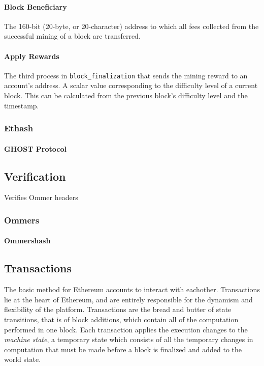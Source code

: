 \documentclass[10pt,a4paper,leqno,bibliography=totoc]{scrartcl}
\newenvironment{alphafootnotes}
{\par\edef\savedfootnotenumber{\number\value{footnote}}
\renewcommand{\thefootnote}{\alph{footnote}}
\setcounter{footnote}{0}}
{\par\setcounter{footnote}{\savedfootnotenumber}}
\begin{document}
\begin{alphafootnotes}
\begin{multicols*}{2}
			\paragraph{Block Beneficiary} The 160-bit (20-byte, or 20-character) address to which all fees collected from the successful mining of a block are transferred.
			\paragraph{Apply Rewards} The third process in \texttt{block\_finalization} that sends the mining reward to an account's address. A scalar value corresponding to the difficulty level of a current block. This can be calculated from the previous block's difficulty level and the timestamp. 

			\subsubsection{Ethash}
	
			\paragraph{GHOST Protocol}

		\subsection{Verification}
		    Verifies Ommer headers

			\subsubsection{Ommers}
				\paragraph{Ommershash}

		\subsection{Transactions}
			The basic method for Ethereum accounts to interact with eachother. Transactions lie at the heart of Ethereum, and are entirely responsible for the dynamism and flexibility of the platform. Transactions are the bread and butter of state transitions, that is of block additions, which contain all of the computation performed in one block. Each transaction applies the execution changes to the \textit{machine state}, a temporary state which consists of all the temporary changes in computation that must be made before a block is finalized and added to the world state.

\end{multicols*}
\end{alphafootnotes}
\end{document}

